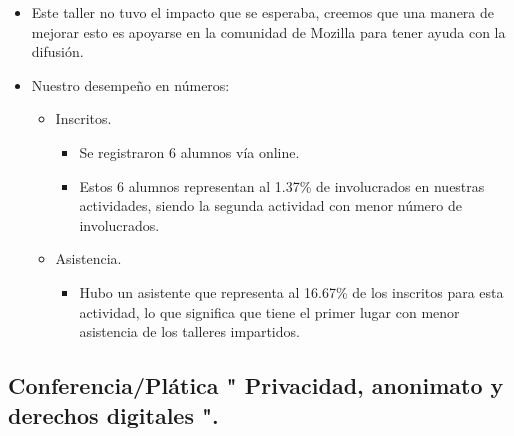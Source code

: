 \documentclass[a4paper,11pt]{article}                 %
\begin{document}
   
    \begin{itemize}
    \item Este taller no tuvo el impacto que se esperaba, creemos que una manera de mejorar esto es apoyarse en la comunidad de Mozilla para tener ayuda con la difusión.
    
    \item Nuestro desempeño en números:
    
    \begin{itemize}
 
    
    \item Inscritos.
    \begin{itemize}
      \item Se registraron 6 alumnos vía online.
      \item Estos 6 alumnos representan al 1.37\% de involucrados en nuestras actividades, siendo la segunda actividad con menor número de involucrados. 
    \end{itemize}
    
    \item Asistencia.
    \begin{itemize}
      \item Hubo un asistente que representa al 16.67\% de los inscritos para esta actividad, lo que significa que tiene el primer lugar con menor asistencia de los talleres impartidos. 
    \end{itemize}
    \end{itemize} 
    
  \end{itemize}  
  
  \subsection{Conferencia/Plática " Privacidad, anonimato y derechos digitales ".}     
  
\end{document}
